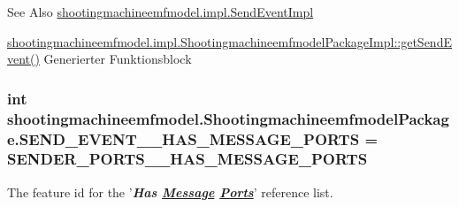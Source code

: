 \begin{DoxySeeAlso}{See Also}
\hyperlink{classshootingmachineemfmodel_1_1impl_1_1_send_event_impl}{shootingmachineemfmodel.\-impl.\-Send\-Event\-Impl} 

\hyperlink{classshootingmachineemfmodel_1_1impl_1_1_shootingmachineemfmodel_package_impl_aa809696addcdd5ce6873eae0d5f4c1e6}{shootingmachineemfmodel.\-impl.\-Shootingmachineemfmodel\-Package\-Impl\-::get\-Send\-Event()} Generierter Funktionsblock 
\end{DoxySeeAlso}
\hypertarget{interfaceshootingmachineemfmodel_1_1_shootingmachineemfmodel_package_ac31f545cdd504a45890a4d2f6dd739a1}{
\subsubsection[{S\-E\-N\-D\-\_\-\-E\-V\-E\-N\-T\-\_\-\-\_\-\-H\-A\-S\-\_\-\-M\-E\-S\-S\-A\-G\-E\-\_\-\-P\-O\-R\-T\-S}]{\setlength{\rightskip}{0pt plus 5cm}int shootingmachineemfmodel.\-Shootingmachineemfmodel\-Package.\-S\-E\-N\-D\-\_\-\-E\-V\-E\-N\-T\-\_\-\-\_\-\-H\-A\-S\-\_\-\-M\-E\-S\-S\-A\-G\-E\-\_\-\-P\-O\-R\-T\-S = {\bf S\-E\-N\-D\-E\-R\-\_\-\-P\-O\-R\-T\-S\-\_\-\-\_\-\-H\-A\-S\-\_\-\-M\-E\-S\-S\-A\-G\-E\-\_\-\-P\-O\-R\-T\-S}}}\label{interfaceshootingmachineemfmodel_1_1_shootingmachineemfmodel_package_ac31f545cdd504a45890a4d2f6dd739a1}
The feature id for the '{\itshape {\bfseries Has \hyperlink{interfaceshootingmachineemfmodel_1_1_message}{Message} \hyperlink{interfaceshootingmachineemfmodel_1_1_ports}{Ports}}}' reference list.

